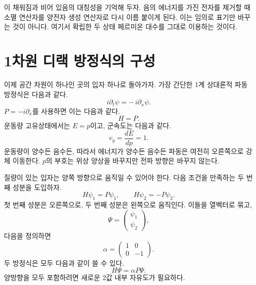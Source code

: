 이 채워짐과 비어 있음의 대칭성을 기억해 두자. 음의 에너지를 가진 전자를 제거할 때 소멸 연산자를 양전자 생성 연산자로 다시 이름 붙이게 된다. 이는 임의로 표기만 바꾸는 것이 아니다. 여기서 확립한 두 상태 페르미온 대수를 그대로 이용하는 것이다.

\section{1차원 디랙 방정식의 구성}

이제 공간 차원이 하나인 곳의 입자 하나로 돌아가자. 가장 간단한 1계 상대론적 파동 방정식은 다음과 같다.
\begin{equation}
i\partial_t\psi=-\,i\partial_x\psi.
\label{eq:l10-right-mover}
\end{equation}
\(P=-i\partial_x\)를 사용하면 이는 다음과 같다.
\begin{equation}
H=P.
\end{equation}
운동량 고유상태에서는 \(E=p\)이고, 군속도는 다음과 같다.
\begin{equation}
v_g=\frac{dE}{dp}=1.
\end{equation}
운동량이 양수든 음수든, 따라서 에너지가 양수든 음수든 파동은 여전히 오른쪽으로 강체 이동한다. \(p\)의 부호는 위상 양상을 바꾸지만 전파 방향은 바꾸지 않는다.

질량이 있는 입자는 양쪽 방향으로 움직일 수 있어야 한다. 다음 조건을 만족하는 두 번째 성분을 도입하자.
\begin{equation}
H\psi_1=P\psi_1,
\qquad
H\psi_2=-P\psi_2.
\label{eq:l10-two-directions}
\end{equation}
첫 번째 성분은 오른쪽으로, 두 번째 성분은 왼쪽으로 움직인다. 이들을 열벡터로 묶고,
\begin{equation}
\Psi=
\begin{pmatrix}
\psi_1\\
\psi_2
\end{pmatrix},
\end{equation}
다음을 정의하면
\begin{equation}
\alpha=
\begin{pmatrix}
1&0\\
0&-1
\end{pmatrix}.
\end{equation}
두 방정식은 모두 다음과 같이 쓸 수 있다.
\begin{equation}
H\Psi=\alpha P\Psi.
\label{eq:l10-massless-one-d}
\end{equation}
양방향을 모두 포함하려면 새로운 2값 내부 자유도가 필요하다.

